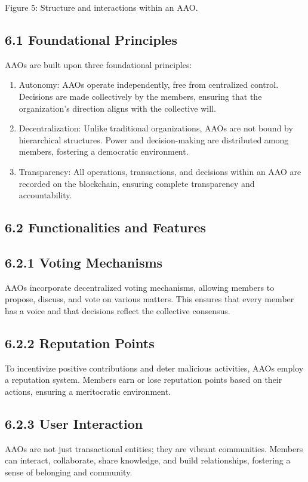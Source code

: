 \documentclass[10pt]{article}
\begin{document}
Figure 5: Structure and interactions within an AAO.

\subsection*{6.1 Foundational Principles}
AAOs are built upon three foundational principles:

\begin{enumerate}
  \item Autonomy: AAOs operate independently, free from centralized control. Decisions are made collectively by the members, ensuring that the organization's direction aligns with the collective will.
  \item Decentralization: Unlike traditional organizations, AAOs are not bound by hierarchical structures. Power and decision-making are distributed among members, fostering a democratic environment.
  \item Transparency: All operations, transactions, and decisions within an AAO are recorded on the blockchain, ensuring complete transparency and accountability.
\end{enumerate}

\subsection*{6.2 Functionalities and Features}
\subsection*{6.2.1 Voting Mechanisms}
AAOs incorporate decentralized voting mechanisms, allowing members to propose, discuss, and vote on various matters. This ensures that every member has a voice and that decisions reflect the collective consensus.

\subsection*{6.2.2 Reputation Points}
To incentivize positive contributions and deter malicious activities, AAOs employ a reputation system. Members earn or lose reputation points based on their actions, ensuring a meritocratic environment.

\subsection*{6.2.3 User Interaction}
AAOs are not just transactional entities; they are vibrant communities. Members can interact, collaborate, share knowledge, and build relationships, fostering a sense of belonging and community.
\end{document}
